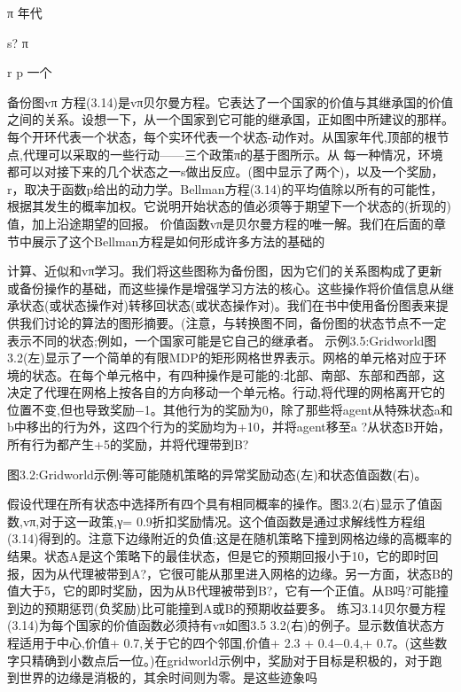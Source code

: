 π
年代




s?
π


r p
一个




备份图vπ
方程(3.14)是vπ贝尔曼方程。它表达了一个国家的价值与其继承国的价值之间的关系。设想一下，从一个国家到它可能的继承国，正如图中所建议的那样。每个开环代表一个状态，每个实环代表一个状态-动作对。从国家年代,顶部的根节点,代理可以采取的一些行动——三个政策π的基于图所示。从
每一种情况，环境都可以对接下来的几个状态之一s做出反应。(图中显示了两个)，以及一个奖励，r，取决于函数p给出的动力学。Bellman方程(3.14)的平均值除以所有的可能性，根据其发生的概率加权。它说明开始状态的值必须等于期望下一个状态的(折现的)值，加上沿途期望的回报。
价值函数vπ是贝尔曼方程的唯一解。我们在后面的章节中展示了这个Bellman方程是如何形成许多方法的基础的

计算、近似和vπ学习。我们将这些图称为备份图，因为它们的关系图构成了更新或备份操作的基础，而这些操作是增强学习方法的核心。这些操作将价值信息从继承状态(或状态操作对)转移回状态(或状态操作对)。我们在书中使用备份图表来提供我们讨论的算法的图形摘要。(注意，与转换图不同，备份图的状态节点不一定表示不同的状态;例如，一个国家可能是它自己的继承者。
示例3.5:Gridworld图3.2(左)显示了一个简单的有限MDP的矩形网格世界表示。网格的单元格对应于环境的状态。在每个单元格中，有四种操作是可能的:北部、南部、东部和西部，这决定了代理在网格上按各自的方向移动一个单元格。行动,将代理的网格离开它的位置不变,但也导致奖励−1。其他行为的奖励为0，除了那些将agent从特殊状态a和b中移出的行为外，这四个行为的奖励均为+10，并将agent移至a ?从状态B开始，所有行为都产生+5的奖励，并将代理带到B?


图3.2:Gridworld示例:等可能随机策略的异常奖励动态(左)和状态值函数(右)。

假设代理在所有状态中选择所有四个具有相同概率的操作。图3.2(右)显示了值函数,vπ,对于这一政策,γ= 0.9折扣奖励情况。这个值函数是通过求解线性方程组(3.14)得到的。注意下边缘附近的负值;这是在随机策略下撞到网格边缘的高概率的结果。状态A是这个策略下的最佳状态，但是它的预期回报小于10，它的即时回报，因为从代理被带到A?，它很可能从那里进入网格的边缘。另一方面，状态B的值大于5，它的即时奖励，因为从B代理被带到B?，它有一个正值。从B吗?可能撞到边的预期惩罚(负奖励)比可能撞到A或B的预期收益要多。
练习3.14贝尔曼方程(3.14)为每个国家的价值函数必须持有vπ如图3.5 3.2(右)的例子。显示数值状态方程适用于中心,价值+ 0.7,关于它的四个邻国,价值+ 2.3 + 0.4−0.4,+ 0.7。(这些数字只精确到小数点后一位。)在gridworld示例中，奖励对于目标是积极的，对于跑到世界的边缘是消极的，其余时间则为零。是这些迹象吗

